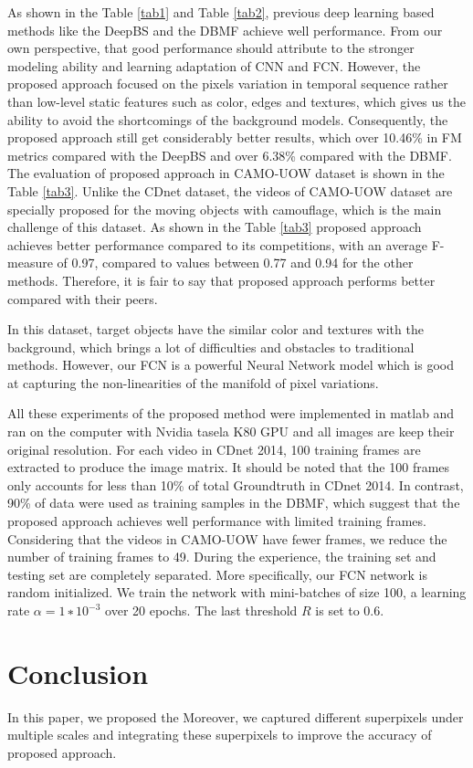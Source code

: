 \documentclass[runningheads,a4paper]{llncs}
\newcommand{\reftab}[1]{Table \ref{#1}}
\begin{document}
	As shown in the \reftab{tab1} and \reftab{tab2}, previous deep learning based methods like the DeepBS and the DBMF achieve well performance. From our own perspective, that good performance should attribute to the stronger modeling ability and learning adaptation of CNN and FCN. However, the proposed approach focused on the pixels variation in temporal sequence rather than low-level static features such as color, edges and textures, which gives us the ability to avoid the shortcomings of the background models. Consequently, the proposed approach still get considerably better results, which over 10.46\% in FM metrics compared with the DeepBS and over 6.38\% compared with the DBMF.
The evaluation of proposed approach in CAMO-UOW dataset is shown in the \reftab{tab3}. Unlike the CDnet dataset, the videos of CAMO-UOW dataset are specially proposed for the moving objects with camouflage, which is the main challenge of this dataset. As shown in the \reftab{tab3} proposed approach achieves better performance compared to its competitions, with an average F-measure of 0.97, compared to values between 0.77 and 0.94 for the other methods. Therefore, it is fair to say that proposed approach performs better compared with their peers. 

In this dataset, target objects have the similar color and textures with the background, which brings a lot of difficulties and obstacles to traditional methods. However, our FCN is a powerful Neural Network model which is good at capturing the non-linearities of the manifold of pixel variations. 

All these experiments of the proposed method were implemented in matlab and ran on the computer with Nvidia tasela K80 GPU and all images are keep their original resolution. For each video in CDnet 2014, 100 training frames are extracted to produce the image matrix. It should be noted that the 100 frames only accounts for less than 10\% of total Groundtruth in CDnet 2014. In contrast, 90\% of data were used as training samples in the DBMF, which suggest that the proposed approach achieves well performance with limited training frames. Considering that the videos in CAMO-UOW have fewer frames, we reduce the number of training frames to 49. During the experience, the training set and testing set are completely separated. More specifically, our FCN network is random initialized. We train the network with mini-batches of size 100, a learning rate $α = 1 ∗ 10^{−3}$ over 20 epochs. The last threshold $R$ is set to 0.6.


\section{Conclusion}
In this paper, we proposed the 
Moreover, we captured different superpixels under multiple scales and
integrating these superpixels to improve the accuracy of proposed approach.
\end{document}

